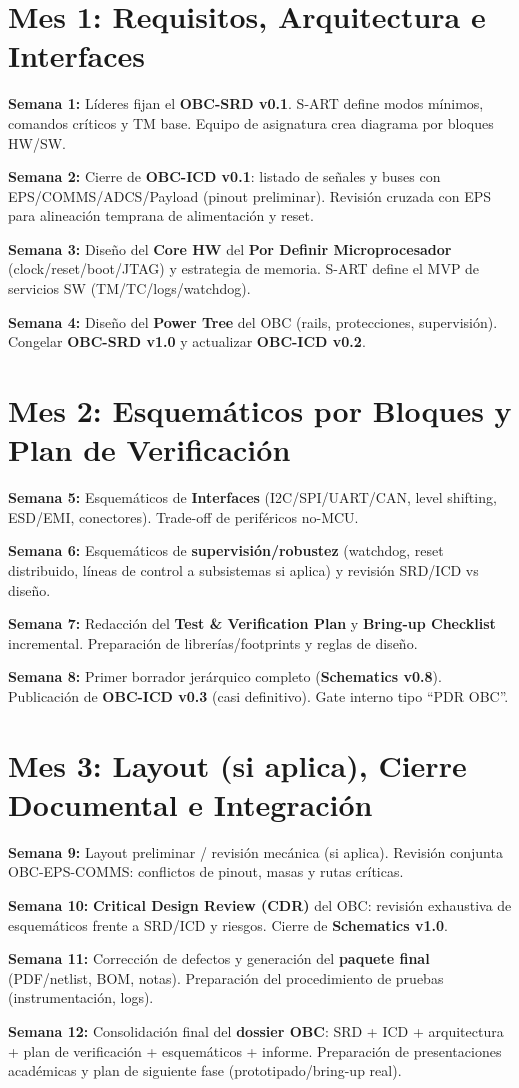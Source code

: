 \section{Mes 1: Requisitos, Arquitectura e Interfaces}
\textbf{Semana 1:} Líderes fijan el \textbf{OBC-SRD v0.1}. S-ART define modos mínimos, comandos críticos y TM base. Equipo de asignatura crea diagrama por bloques HW/SW.

\textbf{Semana 2:} Cierre de \textbf{OBC-ICD v0.1}: listado de señales y buses con EPS/COMMS/ADCS/Payload (pinout preliminar). Revisión cruzada con EPS para alineación temprana de alimentación y reset.

\textbf{Semana 3:} Diseño del \textbf{Core HW} del \textbf{Por Definir Microprocesador} (clock/reset/boot/JTAG) y estrategia de memoria. S-ART define el MVP de servicios SW (TM/TC/logs/watchdog).

\textbf{Semana 4:} Diseño del \textbf{Power Tree} del OBC (rails, protecciones, supervisión). Congelar \textbf{OBC-SRD v1.0} y actualizar \textbf{OBC-ICD v0.2}.

\section{Mes 2: Esquemáticos por Bloques y Plan de Verificación}
\textbf{Semana 5:} Esquemáticos de \textbf{Interfaces} (I2C/SPI/UART/CAN, level shifting, ESD/EMI, conectores). Trade-off de periféricos no-MCU.

\textbf{Semana 6:} Esquemáticos de \textbf{supervisión/robustez} (watchdog, reset distribuido, líneas de control a subsistemas si aplica) y revisión SRD/ICD vs diseño.

\textbf{Semana 7:} Redacción del \textbf{Test \& Verification Plan} y \textbf{Bring-up Checklist} incremental. Preparación de librerías/footprints y reglas de diseño.

\textbf{Semana 8:} Primer borrador jerárquico completo (\textbf{Schematics v0.8}). Publicación de \textbf{OBC-ICD v0.3} (casi definitivo). Gate interno tipo “PDR OBC”.

\section{Mes 3: Layout (si aplica), Cierre Documental e Integración}
\textbf{Semana 9:} Layout preliminar / revisión mecánica (si aplica). Revisión conjunta OBC-EPS-COMMS: conflictos de pinout, masas y rutas críticas.

\textbf{Semana 10:} \textbf{Critical Design Review (CDR)} del OBC: revisión exhaustiva de esquemáticos frente a SRD/ICD y riesgos. Cierre de \textbf{Schematics v1.0}.

\textbf{Semana 11:} Corrección de defectos y generación del \textbf{paquete final} (PDF/netlist, BOM, notas). Preparación del procedimiento de pruebas (instrumentación, logs).

\textbf{Semana 12:} Consolidación final del \textbf{dossier OBC}: SRD + ICD + arquitectura + plan de verificación + esquemáticos + informe. Preparación de presentaciones académicas y plan de siguiente fase (prototipado/bring-up real).

